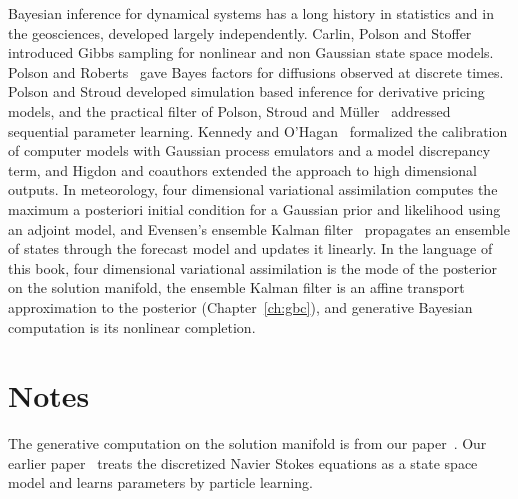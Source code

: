 Bayesian inference for dynamical systems has a long history in statistics and in the geosciences, developed largely independently. Carlin, Polson and Stoffer~\cite{cps1992} introduced Gibbs sampling for nonlinear and non Gaussian state space models. Polson and Roberts~\cite{polsonroberts1994} gave Bayes factors for diffusions observed at discrete times. Polson and Stroud developed simulation based inference for derivative pricing models, and the practical filter of Polson, Stroud and M\"uller~\cite{psm2008} addressed sequential parameter learning. Kennedy and O'Hagan~\cite{kennedyohagan2001} formalized the calibration of computer models with Gaussian process emulators and a model discrepancy term, and Higdon and coauthors extended the approach to high dimensional outputs. In meteorology, four dimensional variational assimilation computes the maximum a posteriori initial condition for a Gaussian prior and likelihood using an adjoint model, and Evensen's ensemble Kalman filter~\cite{evensen1994} propagates an ensemble of states through the forecast model and updates it linearly. In the language of this book, four dimensional variational assimilation is the mode of the posterior on the solution manifold, the ensemble Kalman filter is an affine transport approximation to the posterior (Chapter~\ref{ch:gbc}), and generative Bayesian computation is its nonlinear completion.



\section*{Notes}

The generative computation on the solution manifold is from our paper~\cite{polsonsokolov2026manifold}. Our earlier paper~\cite{polsonsokolov2026ns} treats the discretized Navier Stokes equations as a state space model and learns parameters by particle learning.
